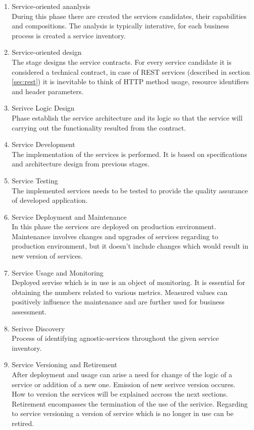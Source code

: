 \begin{enumerate}
  \item Service-oriented ananlysis \\
  During this phase there are created the services candidates, their capabilities and compositions. The analysis is typically interative, for each business process is created a service inventory.
  \item Service-oriented design \\
  The stage designs the service contracts. For every service candidate it is considered a technical contract, in case of REST services (described in section \ref{sec:rest}) it is inevitable to think of HTTP method usage, resource identifiers and header parameters.
  \item Serivce Logic Design \\
  Phase establish the service architecture and its logic so that the service will carrying out the functionality resulted from the contract.
  \item Service Development \\
  The implementation of the services is performed. It is based on specifications and architecture design from previous stages.
  \item Service Testing \\
  The implemented services needs to be tested to provide the quality assurance of developed application.
  \item Service Deployment and Maintenance \\
  In this phase the services are deployed on production environment. Maintenance involves changes and upgrades of services regarding to production environment, but it doesn't include changes which would result in new version of services.
  \item Service Usage and Monitoring \\
  Deployed servise which is in use is an object of monitoring. It is essential for obtaining the numbers related to various metrics. Measured values can positively influence the maintenance and are further used for business assessment.
  \item Serivce Discovery \\
  Process of identifying \gls{agnostic-services} throughout the given service inventory.
  \item Service Versioning and Retirement \\
  After deployment and usage can arise a need for change of the logic of a service or addition of a new one. Emission of new serivce version occures. How to version the services will be explained accross the next sections. Retirement encompasses the termination of the use of the serivice. Regarding to service versioning a version of service which is no longer in use can be retired.
\end{enumerate}

